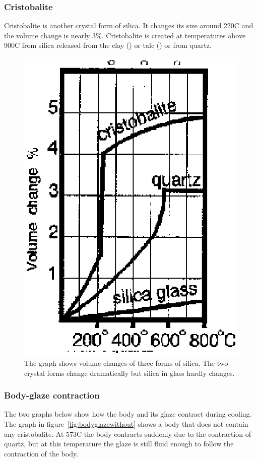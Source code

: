 \subsubsection{Cristobalite}
Cristobalite is another crystal form of silica. It changes its size around 
220\degree C and the volume change is nearly 3\%. Cristobalite is created at 
temperatures above 900\degree C from silica released from the clay 
() or talc () or from quartz.
\begin{figure}[htbp!]
  \centering
  \includegraphics[width=0.6\linewidth]{img/cristobalite.eps}
  \caption{The graph shows volume changes of three forms of silica. The two 
  crystal forms change dramatically but silica in glass hardly changes.}
  \label{fig:cristobalite}
\end{figure}
\subsubsection{Body-glaze contraction}
The two graphs below show how the body and its glaze contract during cooling. 
The graph in figure~\ref{fig:bodyglazewithout} shows a body that does 
not contain any cristobalite. At 573\degree C the body contracts suddenly due 
to the contraction of quartz, but at this temperature the glaze is still fluid 
enough to follow the contraction of the body.

